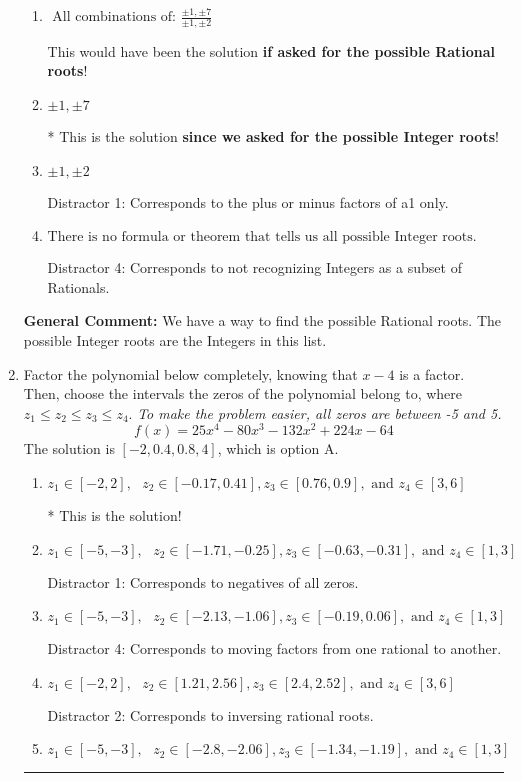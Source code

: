 \documentclass{extbook}[14pt]
\newcommand{\litem}[1]{\item #1

\rule{\textwidth}{0.4pt}}
\begin{document}
\begin{enumerate}
{\begin{enumerate}[label=\Alph*.]
 Distractor 3: Corresponds to the plus or minus of the inverse quotient (an/a0) of the factors. 
\item \( \text{ All combinations of: }\frac{\pm 1,\pm 7}{\pm 1,\pm 2} \)

This would have been the solution \textbf{if asked for the possible Rational roots}!
\item \( \pm 1,\pm 7 \)

* This is the solution \textbf{since we asked for the possible Integer roots}!
\item \( \pm 1,\pm 2 \)

 Distractor 1: Corresponds to the plus or minus factors of a1 only.
\item \( \text{There is no formula or theorem that tells us all possible Integer roots.} \)

 Distractor 4: Corresponds to not recognizing Integers as a subset of Rationals.
\end{enumerate}

\textbf{General Comment:} We have a way to find the possible Rational roots. The possible Integer roots are the Integers in this list.
}
\litem{
Factor the polynomial below completely, knowing that $x -4$ is a factor. Then, choose the intervals the zeros of the polynomial belong to, where $z_1 \leq z_2 \leq z_3 \leq z_4$. \textit{To make the problem easier, all zeros are between -5 and 5.}
\[ f(x) = 25x^{4} -80 x^{3} -132 x^{2} +224 x -64 \]The solution is \( [-2, 0.4, 0.8, 4] \), which is option A.\begin{enumerate}[label=\Alph*.]
\item \( z_1 \in [-2, 2], \text{   }  z_2 \in [-0.17, 0.41], z_3 \in [0.76, 0.9], \text{   and   } z_4 \in [3, 6] \)

* This is the solution!
\item \( z_1 \in [-5, -3], \text{   }  z_2 \in [-1.71, -0.25], z_3 \in [-0.63, -0.31], \text{   and   } z_4 \in [1, 3] \)

 Distractor 1: Corresponds to negatives of all zeros.
\item \( z_1 \in [-5, -3], \text{   }  z_2 \in [-2.13, -1.06], z_3 \in [-0.19, 0.06], \text{   and   } z_4 \in [1, 3] \)

 Distractor 4: Corresponds to moving factors from one rational to another.
\item \( z_1 \in [-2, 2], \text{   }  z_2 \in [1.21, 2.56], z_3 \in [2.4, 2.52], \text{   and   } z_4 \in [3, 6] \)

 Distractor 2: Corresponds to inversing rational roots.
\item \( z_1 \in [-5, -3], \text{   }  z_2 \in [-2.8, -2.06], z_3 \in [-1.34, -1.19], \text{   and   } z_4 \in [1, 3] \)


\end{enumerate}}
\end{enumerate}
\end{document}
